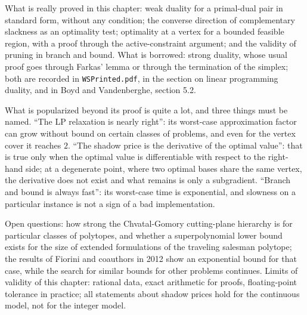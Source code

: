 \begin{untukpeneliti}
What is really proved in this chapter: weak duality for a primal-dual pair in standard form,
without any condition; the converse direction of complementary slackness as an optimality test;
optimality at a vertex for a bounded feasible region, with a proof through the active-constraint
argument; and the validity of pruning in branch and bound. What is borrowed: strong duality,
whose usual proof goes through Farkas' lemma or through the termination of the simplex; both are
recorded in \texttt{WSPrinted.pdf}, in the section on linear programming duality, and in Boyd and
Vandenberghe, section 5.2.

What is popularized beyond its proof is quite a lot, and three things must be named.
``The LP relaxation is nearly right'': its worst-case approximation factor can grow without
bound on certain classes of problems, and even for the vertex cover it reaches $2$. ``The shadow
price is the derivative of the optimal value'': that is true only when the optimal value is
differentiable with respect to the right-hand side; at a degenerate point, where two optimal
bases share the same vertex, the derivative does not exist and what remains is only a
subgradient. ``Branch and bound is always fast'': its worst-case time is exponential, and
slowness on a particular instance is not a sign of a bad implementation.

Open questions: how strong the Chvatal-Gomory cutting-plane hierarchy is for particular classes
of polytopes, and whether a superpolynomial lower bound exists for the size of extended
formulations of the traveling salesman polytope; the results of Fiorini and coauthors in 2012
show an exponential bound for that case, while the search for similar bounds for other problems
continues. Limits of validity of this chapter: rational data, exact arithmetic for proofs,
floating-point tolerance in practice; all statements about shadow prices hold for the continuous
model, not for the integer model.


\end{untukpeneliti}
